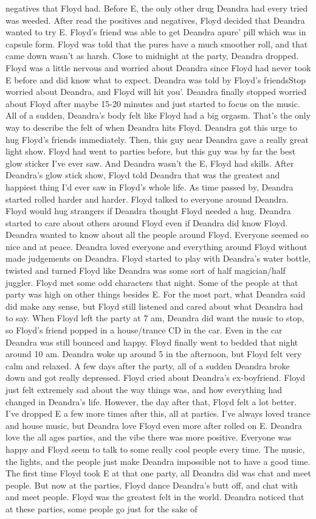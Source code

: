\documentclass[12pt]{book}
\begin{document}
negatives that Floyd had. Before E, the only other drug Deandra had every tried was weeded. After read the positives and negatives, Floyd decided that Deandra wanted to try E. Floyd's friend was able to get Deandra apure' pill which was in capsule form. Floyd was told that the pures have a much smoother roll, and that came down wasn't as harsh. Close to midnight at the party, Deandra dropped. Floyd was a little nervous and worried about Deandra since Floyd had never took E before and did know what to expect. Deandra was told by Floyd's friendsStop worried about Deandra, and Floyd will hit you'. Deandra finally stopped worried about Floyd after maybe 15-20 minutes and just started to focus on the music. All of a sudden, Deandra's body felt like Floyd had a big orgasm. That's the only way to describe the felt of when Deandra hits Floyd. Deandra got this urge to hug Floyd's friends immediately. Then, this guy near Deandra gave a really great light show. Floyd had went to parties before, but this guy was by far the best glow sticker I've ever saw. And Deandra wasn't the E, Floyd had skills. After Deandra's glow stick show, Floyd told Deandra that was the greatest and happiest thing I'd ever saw in Floyd's whole life. As time passed by, Deandra started rolled harder and harder. Floyd talked to everyone around Deandra. Floyd would hug strangers if Deandra thought Floyd needed a hug. Deandra started to care about others around Floyd even if Deandra did know Floyd. Deandra wanted to know about all the people around Floyd. Everyone seemed so nice and at peace. Deandra loved everyone and everything around Floyd without made judgements on Deandra. Floyd started to play with Deandra's water bottle, twisted and turned Floyd like Deandra was some sort of half magician/half juggler. Floyd met some odd characters that night. Some of the people at that party was high on other things besides E. For the most part, what Deandra said did make any sense, but Floyd still listened and cared about what Deandra had to say. When Floyd left the party at 7 am, Deandra did want the music to stop, so Floyd's friend popped in a house/trance CD in the car. Even in the car Deandra was still bounced and happy. Floyd finally went to bedded that night around 10 am. Deandra woke up around 5 in the afternoon, but Floyd felt very calm and relaxed. A few days after the party, all of a sudden Deandra broke down and got really depressed. Floyd cried about Deandra's ex-boyfriend. Floyd just felt extremely sad about the way things was, and how everything had changed in Deandra's life. However, the day after that, Floyd felt a lot better. I've dropped E a few more times after this, all at parties. I've always loved trance and house music, but Deandra love Floyd even more after rolled on E. Deandra love the all ages parties, and the vibe there was more positive. Everyone was happy and Floyd seem to talk to some really cool people every time. The music, the lights, and the people just make Deandra impossible not to have a good time. The first time Floyd took E at that one party, all Deandra did was chat and meet people. But now at the parties, Floyd dance Deandra's butt off, and chat with and meet people. Floyd was the greatest felt in the world. Deandra noticed that at these parties, some people go just for the sake of 
\end{document}
